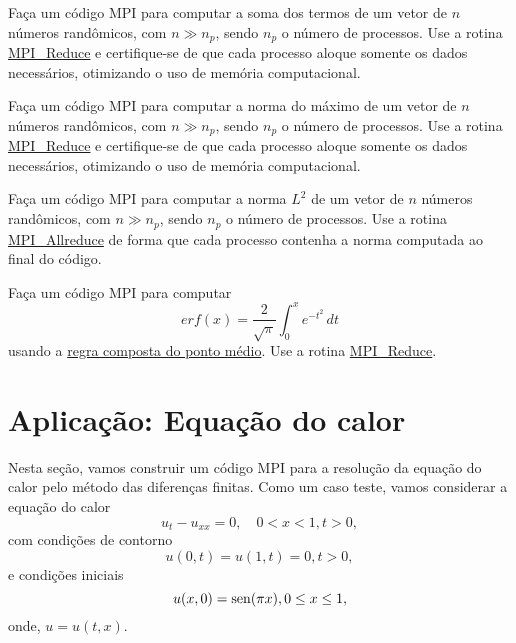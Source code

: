 \begin{exer}
  Faça um código MPI para computar a soma dos termos de um vetor de $n$ números randômicos, com $n\gg n_p$, sendo $n_p$ o número de processos. Use a rotina \href{https://www.open-mpi.org/doc/current/man3/MPI_Reduce.3.php}{MPI\_Reduce} e certifique-se de que cada processo aloque somente os dados necessários, otimizando o uso de memória computacional.
\end{exer}

\begin{exer}
  Faça um código MPI para computar a norma do máximo de um vetor de $n$ números randômicos, com $n\gg n_p$, sendo $n_p$ o número de processos. Use a rotina \href{https://www.open-mpi.org/doc/current/man3/MPI_Reduce.3.php}{MPI\_Reduce} e certifique-se de que cada processo aloque somente os dados necessários, otimizando o uso de memória computacional.
\end{exer}

\begin{exer}
  Faça um código MPI para computar a norma $L^2$ de um vetor de $n$ números randômicos, com $n\gg n_p$, sendo $n_p$ o número de processos. Use a rotina \href{https://www.open-mpi.org/doc/current/man3/MPI_Allreduce.3.php}{MPI\_Allreduce} de forma que cada processo contenha a norma computada ao final do código.
\end{exer}

\begin{exer}
  Faça um código MPI para computar
  \begin{equation}
    erf(x) = \frac{2}{\sqrt{\pi}}\int_0^x e^{-t^2}\,dt
  \end{equation}
  usando a \href{https://phkonzen.github.io/notas/MatematicaNumerica/cap_integr_sec_int_comp.html}{regra composta do ponto médio}. Use a rotina \href{https://www.open-mpi.org/doc/current/man3/MPI_Reduce.3.php}{MPI\_Reduce}.
\end{exer}

\section {Aplicação: Equação do calor}

Nesta seção, vamos construir um código MPI para a resolução da equação do calor pelo método das diferenças finitas. Como um caso teste, vamos considerar a equação do calor
\begin{equation}\label{eq:mpi_calor_eq}
  u_t - u_{xx} = 0,\quad 0<x<1, t>0,
\end{equation}
com condições de contorno
\begin{equation}\label{eq:mpi_calor_cc}
  u(0,t) = u(1,t) = 0, t>0,
\end{equation}
e condições iniciais
\begin{equation}\label{eq:mpi_calor_ci}
  u(x,0) = \operatorname{sen}(\pi x), 0\leq x\leq 1,
\end{equation}
onde, $u = u(t, x)$.


